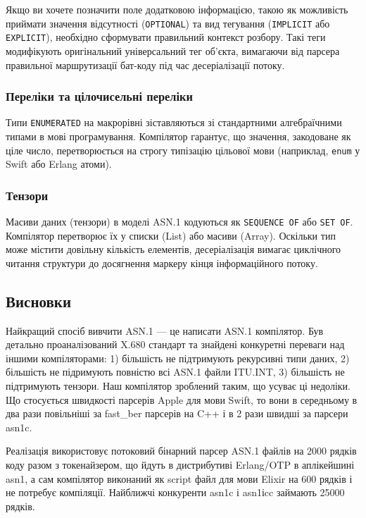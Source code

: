 Якщо ви хочете позначити поле додатковою інформацією, такою як можливість приймати значення відсутності (\texttt{OPTIONAL}) та вид тегування (\texttt{IMPLICIT} або \texttt{EXPLICIT}), необхідно сформувати правильний контекст розбору. Такі теги модифікують оригінальний універсальний тег об'єкта, вимагаючи від парсера правильної маршрутизації бат-коду під час десеріалізації потоку.

\subsubsection{Переліки та цілочисельні переліки}

Типи \texttt{ENUMERATED} на макрорівні зіставляються зі стандартними алгебраїчними типами в мові програмування. Компілятор гарантує, що значення, закодоване як ціле число, перетворюється на строгу типізацію цільової мови (наприклад, \texttt{enum} у Swift або Erlang атоми).

\subsubsection{Тензори}

Масиви даних (тензори) в моделі ASN.1 кодуються як \texttt{SEQUENCE OF} або \texttt{SET OF}. Компілятор перетворює їх у списки (List) або масиви (Array). Оскільки тип може містити довільну кількість елементів, десеріалізація вимагає циклічного читання структури до досягнення маркеру кінця інформаційного потоку.

\newpage
\subsection{Висновки}

Найкращий спосіб вивчити ASN.1 — це написати ASN.1 компілятор. Був детально проаналізований X.680 стандарт та знайдені конкуретні переваги над іншими компіляторами: 1) більшість не підтримують рекурсивні типи даних, 2) більшість не підримують повністю всі ASN.1 файли ITU.INT, 3) більшість не підтримують тензори. Наш компілятор зроблений таким, що усуває ці недоліки. Що стосується швидкості парсерів Apple для мови Swift, то вони в середньому в два рази повільніші за fast\_ber парсерів на C++ і в 2 рази швидші за парсери asn1c.

Реалізація використовує потоковий бінарний парсер ASN.1 файлів на 2000 рядків коду разом з токенайзером, що йдуть в дистрибутиві Erlang/OTP в аплікейшині asn1, а сам компілятор виконаний як script файл для мови Elixir на 600 рядків і не потребує компіляції. Найближчі конкуренти asn1c і asn1іcc займають 25000 рядків.

